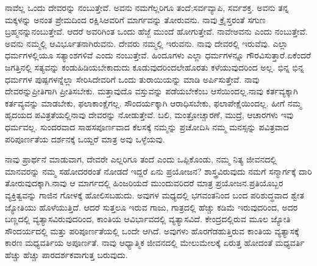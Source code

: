 ನಾವೆಲ್ಲ ಒಂದು ದೇವರನ್ನು ನಂಬುತ್ತೇವೆ. ಅವನು ನಮಗೆಲ್ಲರಿಗೂ ತಂದೆ;\break ಸರ್ವವ್ಯಾಪಿ, ಸರ್ವಶಕ್ತ. ಅವನು ತನ್ನ ಮಕ್ಕಳನ್ನು ಅನಂತ ಪ್ರೇಮದಿಂದ ರಕ್ಷಿಸಿ\break ಅವರಿಗೆ ಮಾರ್ಗವನ್ನು ತೋರುವನು. ನಾವು ಕ್ರೈಸ್ತರಂತೆ ಸಗುಣ ಬ್ರಹ್ಮನನ್ನು\break ನಂಬುತ್ತೇವೆ. ಆದರೆ ಅವರಿಗಿಂತ ಒಂದು ಹೆಜ್ಜೆ ಮುಂದೆ ಹೋಗುತ್ತೇವೆ. ನಾವೇ\break ಅವನು ಎಂದು ನಂಬುತ್ತೇವೆ. ಅವನು ನಮ್ಮಲ್ಲಿ ಆವಿರ್ಭೂತನಾಗಿರುವನು. ದೇವರು ನಮ್ಮಲ್ಲಿ ಇರುವನು. ನಾವು ದೇವರಲ್ಲಿ ಇರುವೆವು. ಎಲ್ಲಾ ಧರ್ಮಗಳಲ್ಲಿಯೂ ಸತ್ಯಾಂಶಗಳಿವೆ ಎಂದು ನಂಬುತ್ತೇವೆ. ಹಿಂದೂಗಳು ಎಲ್ಲಾ ಧರ್ಮಗಳನ್ನೂ ಗೌರವಿಸುತ್ತಾರೆ.\break ಏಕೆಂದರೆ ಜಗತ್ತಿನಲ್ಲಿ ಸತ್ಯವನ್ನು ಕಂಡುಹಿಡಿಯಬೇಕಾದುದು ಕೂಡುವುದರಿಂದಲೇ\break ಹೊರತು ಕಳೆಯುವುದರಿಂದ ಅಲ್ಲ. ಭಿನ್ನ ಭಿನ್ನ ಧರ್ಮಗಳ ಪುಷ್ಪಗಳನ್ನೆಲ್ಲಾ ಸೇರಿಸಿ\break ದೇವರಿಗೆ ಒಂದು ತುರಾಯಿಯನ್ನು ಮಾಡಿ ಅರ್ಪಿಸುತ್ತೇವೆ. ನಾವು ದೇವರನ್ನು\break ಪ್ರೀತಿಗಾಗಿ ಪ್ರೀತಿಸಬೇಕು. ಮತ್ತಾವುದೊ ವಸ್ತುವನ್ನು ಪಡೆಯಬೇಕೆಂಬ ಆಸೆಯಿಂದಲ್ಲ.\break ನಾವು ಕರ್ತವ್ಯಕ್ಕಾಗಿ ಕರ್ತವ್ಯವನ್ನು ಮಾಡಬೇಕು, ಫಲಾಕಾಂಕ್ಷೆಗಲ್ಲ. ಸೌಂದರ್ಯಕ್ಕಾಗಿ ಆರಾಧಿಸಬೇಕು, ಫಲಾಪೇಕ್ಷೆಯಿಂದಲ್ಲ. ಹೀಗೆ ನಮ್ಮ ಹೃದಯದ ಪವಿತ್ರತೆಯಲ್ಲಿ\break ನಾವು ದೇವರನ್ನು ನೋಡುತ್ತೇವೆ. ಬಲಿ, ಮಂತ್ರೋಚ್ಚಾರಣೆ, ಮುದ್ರೆ, ಆಚಾರಗಳು ಇವು ಧರ್ಮವಲ್ಲ. ಸುಂದರವಾದ ಸಾಹಸಪೂರ್ಣವಾದ ಕೆಲಸಕ್ಕೆ ನಮ್ಮನ್ನು ಪ್ರಚೋದಿಸಿ ನಮ್ಮ ಮನಸ್ಸನ್ನು ಪವಿತ್ರವಾದ ಪರಿಪೂರ್ಣತೆಯ ದರ್ಶನಕ್ಕೆ ಒಯ್ದರೆ ಮಾತ್ರ ಅವು ಒಳ್ಳೆಯವು.

ನಾವು ಪ್ರಾರ್ಥನೆ ಮಾಡುವಾಗ, ದೇವರೇ ಎಲ್ಲರಿಗೂ ತಂದೆ ಎಂದು ಒಪ್ಪಿಕೊಂಡು, ನಮ್ಮ ನಿತ್ಯ ಜೀವನದಲ್ಲಿ ಮಾನವರನ್ನು ನಮ್ಮ ಸಹೋದರರಂತೆ ನೋಡದೆ ಇದ್ದರೆ ಏನು ಪ್ರಯೋಜನ? ಶಾಸ್ತ್ರವಿರುವುದು ನಮಗೆ ಸನ್ಮಾರ್ಗಕ್ಕೆ ದಾರಿ ತೋರುವುದಕ್ಕಾಗಿ.\break ನಾವು ಆ ಮಾರ್ಗದಲ್ಲಿ ಹಿಂಜರಿಯದೆ ಮುಂದುವರಿದರೆ ಮಾತ್ರ ಪ್ರಯೋಜನ.\break ಪ್ರತಿಯೊಬ್ಬರ ವ್ಯಕ್ತಿತ್ವವನ್ನು ಗಾಜಿನ ಗೋಳಕ್ಕೆ ಹೋಲಿಸಬಹುದು. ಅವುಗಳ ಮಧ್ಯದಲ್ಲಿ ಭಗವಂತನಿಂದ ಬಂದ ಪರಿಶುದ್ಧವಾದ ಶ್ವೇತ ಜ್ಯೋತಿಯು ಹೊಳೆಯುತ್ತಿದೆ. ಆದರೆ ಸುತ್ತಲೂ ಇರುವ ಗಾಜು, ಗಾತ್ರದಲ್ಲಿ ಹೆಚ್ಚು ಕಡಿಮೆ ಇರುವುದರಿಂದ, ಅದರ ಬಣ್ಣದಲ್ಲಿ ವ್ಯತ್ಯಾಸವಿರುವುದರಿಂದ, ಕಾಂತಿಯ ಆವಿರ್ಭಾವದಲ್ಲಿ ವ್ಯತ್ಯಾಸವಿದೆ. ಕೇಂದ್ರದಲ್ಲಿರುವ ಮೂಲ ಜ್ಯೋತಿ ಸೌಂದರ್ಯದಲ್ಲಿ ಮತ್ತು ಪರಿಪೂರ್ಣತೆಯಲ್ಲಿ ಒಂದೇ ಆಗಿದೆ. ಅವುಗಳು ಹೊರಗೆಡಹುತ್ತಿರುವ ಕಾಂತಿಯ ವ್ಯತ್ಯಾಸಕ್ಕೆ ಕಾರಣ ಮಧ್ಯವರ್ತಿಯ ಅಪೂರ್ಣತೆ. ನಾವು ಆಧ್ಯಾತ್ಮಿಕ ಜೀವನದಲ್ಲಿ ಮೇಲುಮೇಲಕ್ಕೆ ಏರುತ್ತ ಹೋದಂತೆ ಮಧ್ಯವರ್ತಿ ಹೆಚ್ಚು ಹೆಚ್ಚು ಪಾರದರ್ಶಕವಾಗುತ್ತ ಬರುವುದು.

